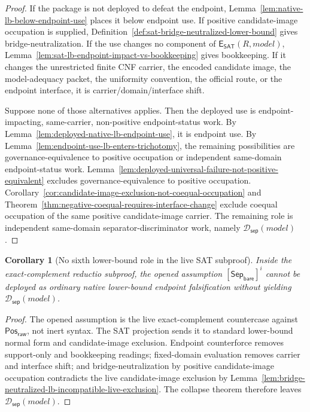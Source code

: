 \documentclass[11pt]{article}
\newtheorem{corollary}[theorem]{Corollary}
\theoremstyle{definition}
\theoremstyle{remark}
\newcommand{\PosRaw}{\mathsf{Pos}_{\mathsf{raw}}}
\newcommand{\SepBare}{\mathsf{Sep}_{\mathsf{bare}}}
\newcommand{\SepDisc}{\mathcal{D}_{\mathsf{sep}}}
\newcommand{\EndpointImpactSAT}{\mathsf{E}_{\mathsf{SAT}}}
\begin{document}
\begin{proof}
If the package is not deployed to defeat the endpoint, Lemma~\ref{lem:native-lb-below-endpoint-use} places it below endpoint use. If positive candidate-image occupation is supplied, Definition~\ref{def:sat-bridge-neutralized-lower-bound} gives bridge-neutralization. If the use changes no component of \(\EndpointImpactSAT(R,model)\), Lemma~\ref{lem:sat-lb-endpoint-impact-vs-bookkeeping} gives bookkeeping. If it changes the unrestricted finite CNF carrier, the encoded candidate image, the model-adequacy packet, the uniformity convention, the official route, or the endpoint interface, it is carrier/domain/interface shift.

Suppose none of those alternatives applies. Then the deployed use is endpoint-impacting, same-carrier, non-positive endpoint-status work. By Lemma~\ref{lem:deployed-native-lb-endpoint-use}, it is endpoint use. By Lemma~\ref{lem:endpoint-use-lb-enters-trichotomy}, the remaining possibilities are governance-equivalence to positive occupation or independent same-domain endpoint-status work. Lemma~\ref{lem:deployed-universal-failure-not-positive-equivalent} excludes governance-equivalence to positive occupation. Corollary~\ref{cor:candidate-image-exclusion-not-coequal-occupation} and Theorem~\ref{thm:negative-coequal-requires-interface-change} exclude coequal occupation of the same positive candidate-image carrier. The remaining role is independent same-domain separator-discriminator work, namely \(\SepDisc(model)\).
\end{proof}

\begin{corollary}[No sixth lower-bound role in the live SAT subproof]\label{cor:no-sixth-lower-bound-role-live-subproof}
Inside the exact-complement reductio subproof, the opened assumption \([\SepBare]^i\) cannot be deployed as ordinary native lower-bound endpoint falsification without yielding \(\SepDisc(model)\).
\end{corollary}

\begin{proof}
The opened assumption is the live exact-complement countercase against \(\PosRaw\), not inert syntax. The SAT projection sends it to standard lower-bound normal form and candidate-image exclusion. Endpoint counterforce removes support-only and bookkeeping readings; fixed-domain evaluation removes carrier and interface shift; and bridge-neutralization by positive candidate-image occupation contradicts the live candidate-image exclusion by Lemma~\ref{lem:bridge-neutralized-lb-incompatible-live-exclusion}. The collapse theorem therefore leaves \(\SepDisc(model)\).
\end{proof}
\end{document}
